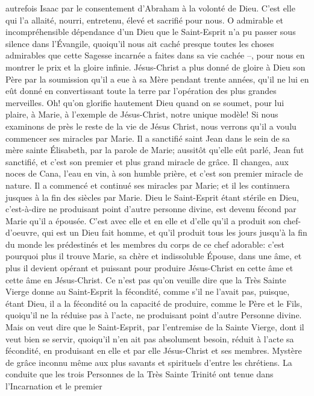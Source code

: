 autrefois Isaac par le consentement d'Abraham à la volonté de Dieu. C'est elle qui l'a allaité, nourri, entretenu,
élevé et sacrifié pour nous.
O admirable et incompréhensible dépendance d'un Dieu que le Saint-Esprit n'a pu passer sous silence dans
l'Évangile, quoiqu'il nous ait caché presque toutes les choses admirables que cette Sagesse incarnée a faites dans
sa vie cachée --, pour nous en montrer le prix et la gloire infinie. Jésus-Christ a plus donné de gloire à Dieu son
Père par la soumission qu'il a eue à sa Mère pendant trente années, qu'il ne lui en eût donné en convertissant
toute la terre par l'opération des plus grandes merveilles. Oh! qu'on glorifie hautement Dieu quand on se soumet,
pour lui plaire, à Marie, à l'exemple de Jésus-Christ, notre unique modèle!
 Si nous examinons de près le reste de la vie de Jésus Christ, nous verrons qu'il a voulu commencer ses
miracles par Marie. Il a sanctifié saint Jean dans le sein de sa mère sainte Élisabeth, par la parole de Marie;
aussitôt qu'elle eût parlé, Jean fut sanctifié, et c'est son premier et plus grand miracle de grâce. Il changea, aux
noces de Cana, l'eau en vin, à son humble prière, et c'est son premier miracle de nature. Il a commencé et
continué ses miracles par Marie; et il les continuera jusques à la fin des siècles par Marie.
 Dieu le Saint-Esprit étant stérile en Dieu, c'est-à-dire ne produisant point d'autre personne divine, est devenu
fécond par Marie qu'il a épousée. C'est avec elle et en elle et d'elle qu'il a produit son chef-d'oeuvre, qui est un
Dieu fait homme, et qu'il produit tous les jours jusqu'à la fin du monde les prédestinés et les membres du corps de
ce chef adorable: c'est pourquoi plus il trouve Marie, sa chère et indissoluble Épouse, dans une âme, et plus il
devient opérant et puissant pour produire Jésus-Christ en cette âme et cette âme en Jésus-Christ.
 Ce n'est pas qu'on veuille dire que la Très Sainte Vierge donne au Saint-Esprit la fécondité, comme s'il ne
l'avait pas, puisque, étant Dieu, il a la fécondité ou la capacité de produire, comme le Père et le Fils, quoiqu'il ne la
réduise pas à l'acte, ne produisant point d'autre Personne divine. Mais on veut dire que le Saint-Esprit, par
l'entremise de la Sainte Vierge, dont il veut bien se servir, quoiqu'il n'en ait pas absolument besoin, réduit à l'acte
sa fécondité, en produisant en elle et par elle Jésus-Christ et ses membres. Mystère de grâce inconnu même aux
plus savants et spirituels d'entre les chrétiens.
 La conduite que les trois Personnes de la Très Sainte Trinité ont tenue dans l'Incarnation et le premier
